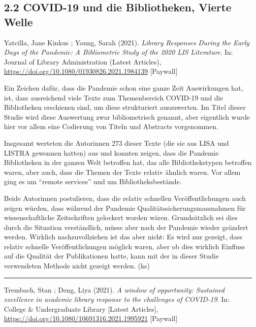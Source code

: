 \documentclass[a4paper,
fontsize=11pt,
oneside,
numbers=noperiodatend,
parskip=half-,
bibliography=totoc,
final
]{scrartcl}
\begin{document}
\hypertarget{covid-19-und-die-bibliotheken-vierte-welle}{%
\subsection{2.2 COVID-19 und die Bibliotheken, Vierte
Welle}\label{covid-19-und-die-bibliotheken-vierte-welle}}

Yatcilla, Jane Kinkus ; Young, Sarah (2021). \emph{Library Responses
During the Early Days of the Pandemic: A Bibliometric Study of the 2020
LIS Literature}. In: Journal of Library Administration (Latest
Articles), \url{https://doi.org/10.1080/01930826.2021.1984139}
{[}Paywall{]}

Ein Zeichen dafür, dass die Pandemie schon eine ganze Zeit Auswirkungen
hat, ist, dass ausreichend viele Texte zum Themenbereich COVID-19 und
die Bibliotheken erschienen sind, um diese strukturiert auszuwerten. Im
Titel dieser Studie wird diese Auswertung zwar bibliometrisch genannt,
aber eigentlich wurde hier vor allem eine Codierung von Titeln und
Abstracts vorgenommen.

Insgesamt werteten die Autorinnen 273 dieser Texte (die sie aus LISA und
LISTRA gewonnen hatten) aus und konnten zeigen, dass die Pandemie
Bibliotheken in der ganzen Welt betroffen hat, das alle Bibliothekstypen
betroffen waren, aber auch, dass die Themen der Texte relativ ähnlich
waren. Vor allem ging es um \enquote{remote services} und um
Bibliotheksbestände.

Beide Autorinnen postulieren, dass die relativ schnellen
Veröffentlichungen auch zeigen würden, dass während der Pandemie
Qualitätssicherungsmassnahmen für wissenschaftliche Zeitschriften
gelockert worden wären. Grundsätzlich sei dies durch die Situation
verständlich, müsse aber nach der Pandemie wieder geändert werden.
Wirklich nachzuvollziehen ist das aber nicht: Es wird nur gezeigt, dass
relativ schnelle Veröffentlichungen möglich waren, aber ob dies wirklich
Einfluss auf die Qualität der Publikationen hatte, kann mit der in
dieser Studie verwendeten Methode nicht gezeigt werden. (ks)

\begin{center}\rule{0.5\linewidth}{0.5pt}\end{center}

Trembach, Stan ; Deng, Liya (2021). \emph{A window of opportunity:
Sustained excellence in academic library response to the challenges of
COVID-19}. In: College \& Undergraduate Library {[}Latest Articles{]},
\url{https://doi.org/10.1080/10691316.2021.1995921} {[}Paywall{]}
\end{document}
